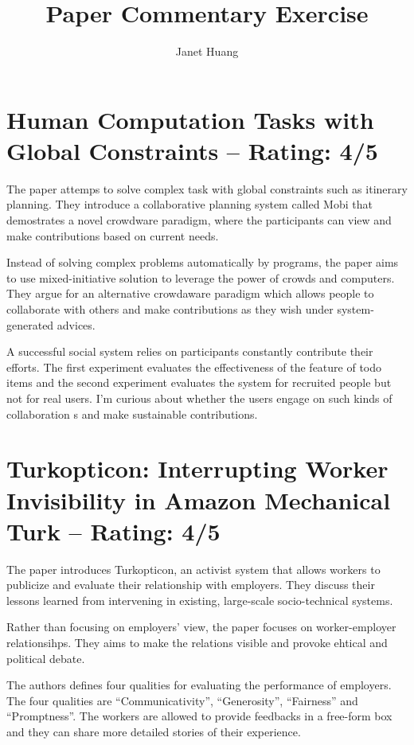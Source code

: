 \documentclass[a4paper]{article}
\title{Paper Commentary Exercise}
\author{Janet Huang}
\begin{document}
\maketitle

\section{Human Computation Tasks with Global Constraints -- Rating: 4/5}
The paper \cite{Zhang2012b} attemps to solve complex task with global constraints such as itinerary planning. They introduce a collaborative planning system called Mobi that demostrates a novel crowdware paradigm, where the participants can view and make contributions based on current needs.

Instead of solving complex problems automatically by programs, the paper aims to use mixed-initiative solution to leverage the power of crowds and computers. They argue for an alternative crowdaware paradigm which allows people to collaborate with others and make contributions as they wish under system-generated advices.

A successful social system relies on participants constantly contribute their efforts. The first experiment evaluates the effectiveness of the feature of todo items and the second experiment evaluates the system for recruited people but not for real users. I'm curious about whether the users engage on such kinds of collaboration  s and make sustainable contributions.


\section{Turkopticon: Interrupting Worker Invisibility in Amazon Mechanical Turk -- Rating: 4/5}
The paper \cite{Irani2013} introduces Turkopticon, an activist system that allows workers to publicize and evaluate their relationship with employers. They discuss their lessons learned from intervening in existing, large-scale socio-technical systems.

Rather than focusing on employers' view, the paper focuses on worker-employer relationsihps. They aims to make the relations visible and provoke ehtical and political debate.

The authors defines four qualities for evaluating the performance of employers. The four qualities are ``Communicativity'', ``Generosity'', ``Fairness'' and ``Promptness''. The workers are allowed to provide feedbacks in a free-form box and they can share more detailed stories of their experience.
\end{document}
